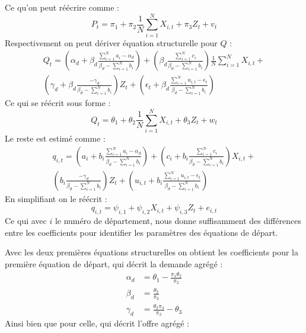 \documentclass[11pt, a4paper]{article}
\begin{document}
Ce qu'on peut réécrire comme :
\begin{equation}
  P_t = \pi_1 + 
      \pi_2 \frac{1}{N} \sum_{i = 1}^{N} X_{i,t} +
      \pi_3 Z_t + 
      v_t
\end{equation}
Respectivement on peut dériver équation structurelle pour $Q$ :
\begin{multline}
    Q_t = (\alpha_d + \beta_d \frac{\sum_{i = 1}^{N} a_i - \alpha_d}{\beta_d - \sum_{i = 1}^{N} b_i}) + 
        (\beta_d \frac{\sum_{i = 1}^{N} c_i}{\beta_d - \sum_{i = 1}^{N} b_i}) \frac{1}{N} \sum_{i = 1}^{N} X_{i,t} + \\
        (\gamma_d + \beta_d \frac{-\gamma_d}{\beta_d - \sum_{i = 1}^{N} b_i}) Z_t + 
        (\epsilon_t + \beta_d \frac{\sum_{i = 1}^{N} u_{i,t} - \epsilon_t}{\beta_d - \sum_{i = 1}^{N} b_i})
\end{multline}
Ce qui se réécrit sous forme :
\begin{equation}
  Q_t = \theta_1 + 
      \theta_2 \frac{1}{N} \sum_{i = 1}^{N} X_{i,t} +
      \theta_3 Z_t + 
      w_t
\end{equation}
Le reste est estimé comme :
\begin{multline}
  q_{i,t} = (a_i + b_i \frac{\sum_{i = 1}^{N} a_i - \alpha_d}{\beta_d - \sum_{i = 1}^{N} b_i}) + 
      (c_i + b_i \frac{\sum_{i = 1}^{N} c_i}{\beta_d - \sum_{i = 1}^{N} b_i}) X_{i,t} + \\
      (b_i \frac{-\gamma_d}{\beta_d - \sum_{i = 1}^{N} b_i}) Z_t + 
      (u_{i,t} + b_i \frac{\sum_{i = 1}^{N} u_{i,t} - \epsilon_t}{\beta_d - \sum_{i = 1}^{N} b_i})
\end{multline}
En simplifiant on le réécrit : 
\begin{equation}
  q_{i,t} = \psi_{i,1} + 
      \psi_{i,2} X_{i,t} +
      \psi_{i,3} Z_t + 
      e_{i,t}
\end{equation}
Ce qui avec $i$ le numéro de département, nous donne suffisamment des différences entre les coefficients pour identifier les paramètres des équations de départ. 
\par
Avec les deux premières équations structurelles on obtient les coefficients pour la première équation de départ, qui décrit la demande agrégé :
\begin{align}
  \alpha_d & = \theta_1 - \frac{\pi_1 \theta_2}{\pi_2} \\
  \beta_d & = \frac{\theta_2}{\pi_2} \\
  \gamma_d & = \frac{\theta_2 \pi_3}{\pi_2} - \theta_3
\end{align}
Ainsi bien que pour celle, qui décrit l'offre agrégé :
\end{document}
